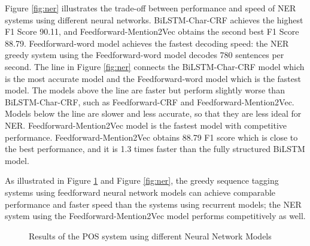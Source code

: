 \documentclass{sfuthesis}
\begin{document}
Figure \ref{fig:ner} illustrates the trade-off between performance and speed of NER systems using different neural networks. BiLSTM-Char-CRF achieves the highest F1 Score 90.11, and Feedforward-Mention2Vec obtains the second best F1 Score 88.79. Feedforward-word model achieves the fastest decoding speed: the NER greedy system using the Feedforward-word model decodes 780 sentences per second. The line in Figure \ref{fig:ner} connects the BiLSTM-Char-CRF model which is the most accurate model and the Feedforward-word model which is the fastest model. The models above the line are faster but perform slightly worse than BiLSTM-Char-CRF, such as Feedforward-CRF and Feedforward-Mention2Vec. Models below the line are slower and less accurate, so that they are less ideal for NER. Feedforward-Mention2Vec model is the fastest model with competitive performance. Feedforward-Mention2Vec obtains 88.79 F1 score which is close to the best performance, and it is 1.3 times faster than the fully structured BiLSTM model.

As illustrated in Figure \ref{fig:pos} and Figure \ref{fig:ner}, the greedy sequence tagging systems using feedforward neural network models can achieve comparable performance and faster speed than the systems using recurrent models; the NER system using the Feedforward-Mention2Vec model performs competitively as well.

\begin{figure}
 \caption{Results of the POS system using different Neural Network Models}
  \label{fig:pos}
\end{figure}
\end{document}
